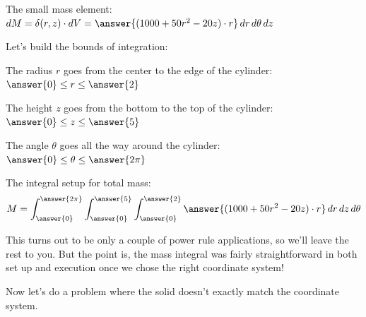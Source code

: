\documentclass{ximera}
\begin{document}
\begin{problem}


The small mass element: $dM = \delta(r,z) \cdot dV = \answer{(1000 + 50r^2 - 20z) \cdot r}\,dr\,d\theta\,dz$

Let's build the bounds of integration:

The radius $r$ goes from the center to the edge of the cylinder: $\answer{0} \leq r \leq \answer{2}$

The height $z$ goes from the bottom to the top of the cylinder: $\answer{0} \leq z \leq \answer{5}$

The angle $\theta$ goes all the way around the cylinder: $\answer{0} \leq \theta \leq \answer{2\pi}$

The integral setup for total mass:
$$M = \int_{\answer{0}}^{\answer{2\pi}} \int_{\answer{0}}^{\answer{5}} \int_{\answer{0}}^{\answer{2}} \answer{(1000 + 50r^2 - 20z) \cdot r}\,dr\,dz\,d\theta$$

This turns out to be only a couple of power rule applications, so we'll leave the rest to you. But the point is, the mass integral was fairly straightforward in both set up and execution once we chose the right coordinate system!

\end{problem}

Now let's do a problem where the solid doesn't exactly match the coordinate system.
\end{document}
